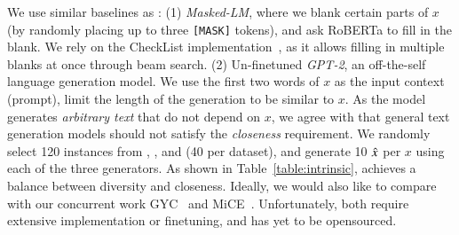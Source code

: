 We use similar baselines as \citet{madaan2020generate}: 
(1) \emph{Masked-LM}, where we blank certain parts of $x$ (by randomly placing up to three \texttt{[MASK]} tokens), and ask RoBERTa to fill in the blank.
We rely on the CheckList implementation~\cite{checklist:acl20}, as it allows filling in multiple blanks at once through beam search. 
(2) Un-finetuned \emph{GPT-2}, an off-the-self language generation model.
We use the first two words of $x$ as the input context (prompt), limit the length of the generation to be similar to $x$.
As the model generates \emph{arbitrary text} that do not depend on $x$, we agree with \citet{madaan2020generate} that general text generation models should not satisfy the \emph{closeness} requirement.
We randomly select 120 instances from \qqp, \dnli, and \dsst (40 per dataset), and generate 10 $\hat{x}$ per $x$ using each of the three generators.
As shown in Table~\ref{table:intrinsic}, \sysname achieves a balance between diversity and closeness.
Ideally, we would also like to compare \sysname with our concurrent work GYC~\cite{madaan2020generate} and MiCE~\cite{ross2020explaining}.
Unfortunately, both require extensive implementation or finetuning, and has yet to be opensourced.



